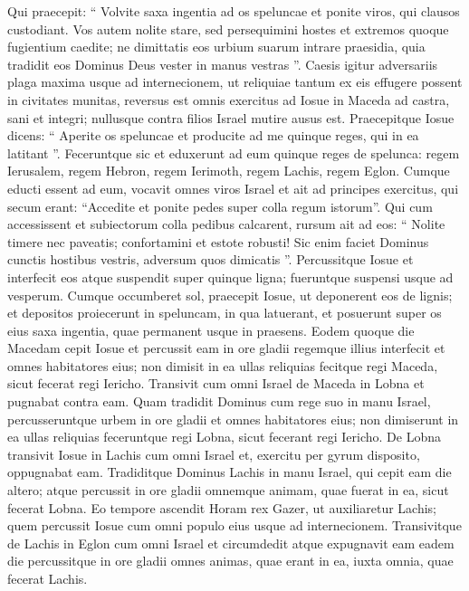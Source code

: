 \begin{biblechapter}
\begin{biblechapter}
\begin{biblechapter}
\begin{biblechapter}
\begin{biblechapter}
\begin{biblechapter}
\begin{biblechapter}
\begin{biblechapter}
\begin{biblechapter}
\begin{biblechapter}
\verse Qui praecepit: “ Volvite saxa ingentia ad os speluncae et ponite viros, qui clausos custodiant. 
\verse Vos autem nolite stare, sed persequimini hostes et extremos quoque fugientium caedite; ne dimittatis eos urbium suarum intrare praesidia, quia tradidit eos Dominus Deus vester in manus vestras ”.
 \verse Caesis igitur adversariis plaga maxima usque ad internecionem, ut reliquiae tantum ex eis effugere possent in civitates munitas, 
\verse reversus est omnis exercitus ad Iosue in Maceda ad castra, sani et integri; nullusque contra filios Israel mutire ausus est.
 \verse Praecepitque Iosue dicens: “ Aperite os speluncae et producite ad me quinque reges, qui in ea latitant ”. 
\verse Feceruntque sic et eduxerunt ad eum quinque reges de spelunca: regem Ierusalem, regem Hebron, regem Ierimoth, regem Lachis, regem Eglon. 
\verse Cumque educti essent ad eum, vocavit omnes viros Israel et ait ad principes exercitus, qui secum erant: “Accedite et ponite pedes super colla regum istorum”. Qui cum accessissent et subiectorum colla pedibus calcarent, 
\verse rursum ait ad eos: “ Nolite timere nec paveatis; confortamini et estote robusti! Sic enim faciet Dominus cunctis hostibus vestris, adversum quos dimicatis ”. 
\verse Percussitque Iosue et interfecit eos atque suspendit super quinque ligna; fueruntque suspensi usque ad vesperum. 
\verse Cumque occumberet sol, praecepit Iosue, ut deponerent eos de lignis; et depositos proiecerunt in speluncam, in qua latuerant, et posuerunt super os eius saxa ingentia, quae permanent usque in praesens.
 \verse Eodem quoque die Macedam cepit Iosue et percussit eam in ore gladii regemque illius interfecit et omnes habitatores eius; non dimisit in ea ullas reliquias fecitque regi Maceda, sicut fecerat regi Iericho.
 \verse Transivit cum omni Israel de Maceda in Lobna et pugnabat contra eam. 
\verse Quam tradidit Dominus cum rege suo in manu Israel, percusseruntque urbem in ore gladii et omnes habitatores eius; non dimiserunt in ea ullas reliquias feceruntque regi Lobna, sicut fecerant regi Iericho.
 \verse De Lobna transivit Iosue in Lachis cum omni Israel et, exercitu per gyrum disposito, oppugnabat eam. 
\verse Tradiditque Dominus Lachis in manu Israel, qui cepit eam die altero; atque percussit in ore gladii omnemque animam, quae fuerat in ea, sicut fecerat Lobna. 
\verse Eo tempore ascendit Horam rex Gazer, ut auxiliaretur Lachis; quem percussit Iosue cum omni populo eius usque ad internecionem. 
\verse Transivitque de Lachis in Eglon cum omni Israel et circumdedit 
\verse atque expugnavit eam eadem die percussitque in ore gladii omnes animas, quae erant in ea, iuxta omnia, quae fecerat Lachis.

\end{biblechapter}
\end{biblechapter}
\end{biblechapter}
\end{biblechapter}
\end{biblechapter}
\end{biblechapter}
\end{biblechapter}
\end{biblechapter}
\end{biblechapter}
\end{biblechapter}
